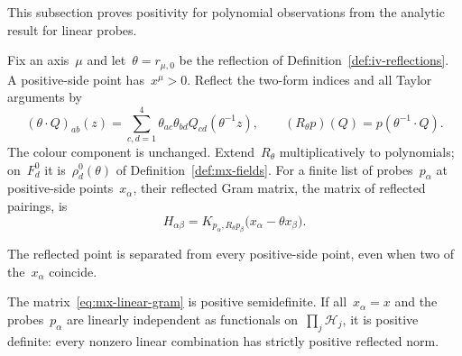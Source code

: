 This subsection proves positivity for polynomial observations from the analytic result for linear probes.
\begin{definition}\label{def:mx-reflection}
Fix an axis~$\mu$ and let~$\theta=r_{\mu,0}$ be the reflection of Definition~\ref{def:iv-reflections}.
A positive-side point has~$x^\mu>0$.
Reflect the two-form indices and all Taylor arguments by
\begin{equation*}
 (\theta\cdot Q)_{ab}(z)=\sum_{c,d=1}^4\theta_{ac}\theta_{bd}Q_{cd}(\theta^{-1}z),
 \qquad (R_\theta p)(Q)=p(\theta^{-1}\cdot Q).
\end{equation*}
The colour component is unchanged.
Extend~$R_\theta$ multiplicatively to polynomials; on~$F_d^0$ it is~$\rho_d^0(\theta)$ of Definition~\ref{def:mx-fields}.
For a finite list of probes~$p_\alpha$ at positive-side points~$x_\alpha$, their reflected Gram matrix, the matrix of reflected pairings, is
\begin{equation}\label{eq:mx-linear-gram}
 H_{\alpha\beta}
 =K_{p_\alpha,R_\theta p_\beta}\bigl(x_\alpha-\theta x_\beta\bigr).
\end{equation}
\end{definition}

The reflected point is separated from every positive-side point, even when two of the~$x_\alpha$ coincide.

\begin{lemma}\label{lem:mx-linear-positive}
The matrix~\eqref{eq:mx-linear-gram} is positive semidefinite.
If all~$x_\alpha=x$ and the probes~$p_\alpha$ are linearly independent as functionals on~$\prod_j\mathcal H_j$, it is positive definite: every nonzero linear combination has strictly positive reflected norm.
\end{lemma}


